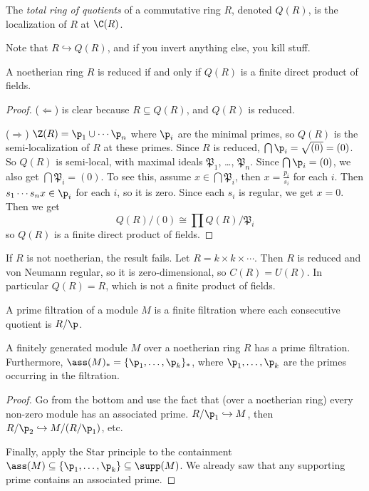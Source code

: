  \begin{definition}
   The \emph{total ring of quotients} of a commutative ring $R$, denoted $Q(R)$, is the
   localization of $R$ at $\C(R)$.
 \end{definition}
 Note that $R\hookrightarrow Q(R)$, and if you invert anything else, you kill stuff.

 \begin{theorem}
   A noetherian ring $R$ is reduced if and only if $Q(R)$ is a finite direct product of
   fields.
 \end{theorem}
 \begin{proof}\def\P{\mathfrak{P}}
   ($\Leftarrow$) is clear because $R\subseteq Q(R)$, and $Q(R)$ is reduced.

   ($\Rightarrow$) $\Z(R) = \p_1\cup \cdots \p_n$ where $\p_i$ are the minimal primes, so
   $Q(R)$ is the semi-localization of $R$ at these primes. Since $R$ is reduced, $\bigcap
   \p_i=\sqrt{(0)}=(0)$. So $Q(R)$ is semi-local, with maximal ideals $\P_1$, \dots,
   $\P_n$. Since $\bigcap \p_i=(0)$, we also get $\bigcap \P_i=(0)$. To see this, assume
   $x\in \bigcap \P_i$, then $x=\frac{p_i}{s_i}$ for each $i$. Then $s_1\cdots s_n x\in
   \p_i$ for each $i$, so it is zero. Since each $s_i$ is regular, we get $x=0$.
   Then we get
   \[
    Q(R)/(0) \cong \prod Q(R)/\P_i
   \]
   so $Q(R)$ is a finite direct product of fields.
 \end{proof}
 \begin{example}
   If $R$ is not noetherian, the result fails. Let $R=k\times k\times \cdots$. Then $R$
   is reduced and von Neumann regular, so it is zero-dimensional, so $C(R)=U(R)$. In
   particular $Q(R)=R$, which is not a finite product of fields.
 \end{example}

 \begin{definition}
   A prime filtration of a module $M$ is a finite filtration where each consecutive
   quotient is $R/\p$.
 \end{definition}
 \begin{theorem}
   A finitely generated module $M$ over a noetherian ring $R$ has a prime filtration.
   Furthermore, $\ass(M)_* = \{\p_1,\dots, \p_k\}_*$, where $\p_1,\dots, \p_k$ are the
   primes occurring in the filtration.
 \end{theorem}
 \begin{proof}
   Go from the bottom and use the fact that (over a noetherian ring) every non-zero
   module has an associated prime. $R/\p_1\hookrightarrow M$, then $R/\p_2\hookrightarrow
   M/(R/\p_1)$, etc.

   Finally, apply the Star principle to the containment $\ass (M)\subseteq \{\p_1,\dots,
   \p_k\} \subseteq \supp (M)$. We already saw that any supporting prime contains an
   associated prime.
 \end{proof}
 \setcounter{lecture}{12}

